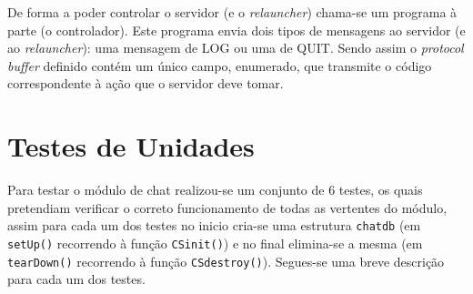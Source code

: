 \documentclass[a4paper]{article}
\begin{document}
	De forma a poder controlar o servidor (e o \textit{relauncher}) chama-se um programa à parte (o controlador). Este programa envia dois tipos de mensagens ao servidor (e ao \textit{relauncher}): uma mensagem de LOG ou uma de QUIT. Sendo assim o \textit{protocol buffer} definido contém um único campo, enumerado, que transmite o código correspondente à ação que o servidor deve tomar. 


	\section{Testes de Unidades}

	Para testar o módulo de chat realizou-se um conjunto de 6 testes, os quais pretendiam verificar o correto funcionamento de todas as vertentes do módulo, assim para cada um dos testes no inicio cria-se uma estrutura \texttt{chatdb} (em \texttt{setUp()} recorrendo à função \texttt{CSinit()}) e no final elimina-se a mesma (em \texttt{tearDown()} recorrendo à função \texttt{CSdestroy()}). Segues-se uma breve descrição para cada um dos testes.
\end{document}
